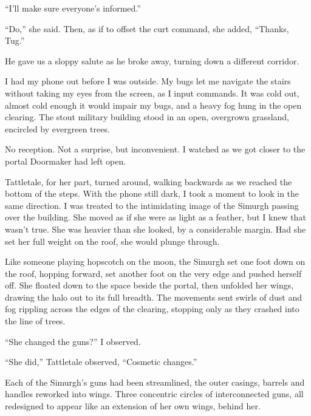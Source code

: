 ``I'll make sure everyone's informed.''



``Do,'' she said.  Then, as if to offset the curt command, she added, ``Thanks, Tug.''



He gave us a sloppy salute as he broke away, turning down a different corridor.



I had my phone out before I was outside.  My bugs let me navigate the stairs without taking my eyes from the screen, as I input commands.  It was cold out, almost cold enough it would impair my bugs, and a heavy fog hung in the open clearing.  The stout military building stood in an open, overgrown grassland, encircled by evergreen trees.



No reception.  Not a surprise, but inconvenient.  I watched as we got closer to the portal Doormaker had left open.



Tattletale, for her part, turned around, walking backwards as we reached the bottom of the steps.  With the phone still dark, I took a moment to look in the same direction.  I was treated to the intimidating image of the Simurgh passing over the building.  She moved as if she were as light as a feather, but I knew that wasn't true.  She was heavier than she looked, by a considerable margin.  Had she set her full weight on the roof, she would plunge through.



Like someone playing hopscotch on the moon, the Simurgh set one foot down on the roof, hopping forward, set another foot on the very edge and pushed herself off.  She floated down to the space beside the portal, then unfolded her wings, drawing the halo out to its full breadth.  The movements sent swirls of dust and fog rippling across the edges of the clearing, stopping only as they crashed into the line of trees.



``She changed the guns?'' I observed.



``She did,'' Tattletale observed, ``Cosmetic changes.''



Each of the Simurgh's guns had been streamlined, the outer casings, barrels and handles reworked into wings.  Three concentric circles of interconnected guns, all redesigned to appear like an extension of her own wings, behind her.



